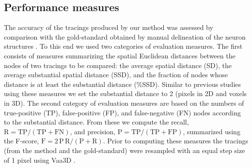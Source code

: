 \documentclass[noinfo,nocrop,final]{bioinfo}
\begin{document}
\subsection{Performance measures}
\label{subsec:performance-measures}
The accuracy of the tracings produced by our method was assessed by comparison with the gold-standard obtained by manual delineation of the neuron structures \citep{gillette2011diademchallenge, Meijering-2004}. To this end we used two categories of evaluation measures. The first consists of measures summarizing the spatial Euclidean distances between the nodes of two tracings to be compared: the average spatial distance (SD), the average substantial spatial distance (SSD), and the fraction of nodes whose distance is at least the substantial distance (\%SSD). Similar to previous studies using these measures \citep{peng2010v3d} we set the substantial distance to 2 (pixels in 2D and voxels in 3D). The second category of evaluation measures are based on the numbers of true-positive (TP), false-positive (FP), and false-negative (FN) nodes according to the substantial distance. From these we compute the recall, $\textrm{R}=\textrm{TP}/(\textrm{TP}+\textrm{FN})$, and precision, $\textrm{P}=\textrm{TP}/(\textrm{TP}+\textrm{FP})$, summarized using the F-score, $\textrm{F}=2\,\textrm{P}\,\textrm{R}/(\textrm{P}+\textrm{R})$. Prior to computing these measures the tracings (from the method and the gold-standard) were resampled with an equal step size of 1 pixel using Vaa3D \citep{peng2010v3d}.
\end{document}
